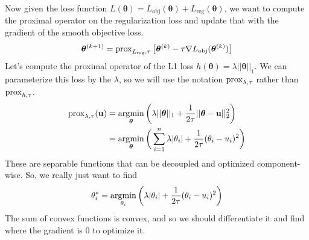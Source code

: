   Now given the loss function $L (\boldsymbol{\theta}) = L_{\mathrm{obj}} (\boldsymbol{\theta}) + L_{\mathrm{reg}} (\boldsymbol{\theta})$, we want to compute the proximal operator on the regularization loss and update that with the gradient of the smooth objective loss. 
  \begin{equation}
    \boldsymbol{\theta}^{(k+1)} = \prox_{L_{\mathrm{reg}}, \tau} \big[ \boldsymbol{\theta}^{(k)} - \tau \nabla L_{\mathrm{obj}} (\boldsymbol{\theta}^{(k)}) \big]
  \end{equation}
  Let's compute the proximal operator of the L1 loss $h(\boldsymbol{\theta}) = \lambda ||\boldsymbol{\theta}||_1$. We can parameterize this loss by the $\lambda$, so we will use the notation $\prox_{\lambda, \tau}$ rather than $\prox_{h, \tau}$. 
  \begin{align*}
    \prox_{\lambda, \tau} (\mathbf{u}) & = \argmin_{\boldsymbol{\theta}} \bigg( \lambda ||\boldsymbol{\theta}||_1 + \frac{1}{2\tau} ||\boldsymbol{\theta} - \mathbf{u}||_2^2 \bigg) \\
    & = \argmin_{\boldsymbol{\theta}} \bigg( \sum_{i=1}^n \lambda |\theta_i| + \frac{1}{2\tau} (\theta_i - u_i)^2 \bigg) 
  \end{align*}
  These are separable functions that can be decoupled and optimized component-wise. So, we really just want to find 
  \begin{equation}
    \theta_i^\ast = \argmin_{\theta_i} \bigg( \lambda |\theta_i| + \frac{1}{2\tau} (\theta_i - u_i)^2 \bigg)
  \end{equation}
  The sum of convex functions is convex, and so we should differentiate it and find where the gradient is $0$ to optimize it. 
